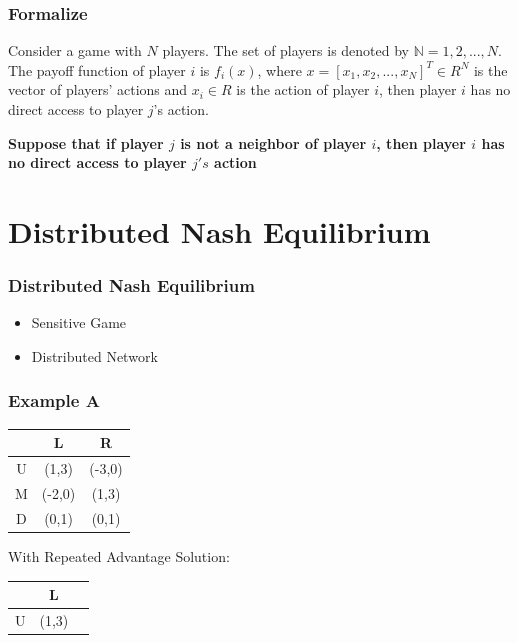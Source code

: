 \documentclass[notheorems, aspectratio=54]{beamer}
\begin{document}
\begin{frame}
  \frametitle{Formalize}
  Consider a game with $N$ players.
  The set of players is denoted by $\mathbb{N}={1, 2, ..., N}$.
  The payoff function of player $i$ is $f_i(x)$,
  where $x = [x_1, x_2,...,x_N]^T \in R^N$ is the vector of players' actions
  and $x_i \in R$ is the action of player $i$,
  then player $i$ has no direct access to player $j$'s action.\newline

  \bfseries{Suppose that if player $j$ is not a neighbor of player $i$, then player $i$ has no direct access to player $j's$ action}
\end{frame}





\section {Distributed Nash Equilibrium}


\begin{frame}
  \frametitle{Distributed Nash Equilibrium}
  \begin{itemize}
    \item Sensitive Game
    \item Distributed Network
  \end{itemize}

\end{frame}


\begin{frame}
  \frametitle{Example A}
  \begin{center}
    \begin{tabular}{c|c|c|}
      & L & R \\
      \hline
      U & (1,3)&(-3,0)\\
      \hline
      M & (-2,0)&(1,3)\\
      \hline
      D & (0,1)&(0,1)\\
    \end{tabular}
  \end{center}
  With Repeated Advantage Solution:
  \begin{center}
    \begin{tabular}{c|c|c|}
      & L \\
      \hline
      U & (1,3)\\
      \hline
    \end{tabular}
  \end{center}
\end{frame}
\end{document}
